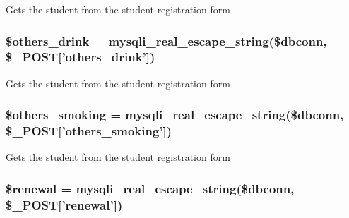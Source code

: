 \-Gets the student from the student registration form \hypertarget{admin__view_2validate_2studentVal_8php_ad8d98a0ffa836c8f5ff6cd94cc18dca1}{
\subsubsection[{\$others\-\_\-drink}]{\setlength{\rightskip}{0pt plus 5cm}\$others\-\_\-drink = mysqli\-\_\-real\-\_\-escape\-\_\-string(\$dbconn, \$\-\_\-\-P\-O\-S\-T\mbox{[}'others\-\_\-drink'\mbox{]})}}\label{admin__view_2validate_2studentVal_8php_ad8d98a0ffa836c8f5ff6cd94cc18dca1}
\-Gets the student from the student registration form \hypertarget{admin__view_2validate_2studentVal_8php_a41f287196869fc73324563f84fc1ea73}{
\subsubsection[{\$others\-\_\-smoking}]{\setlength{\rightskip}{0pt plus 5cm}\$others\-\_\-smoking = mysqli\-\_\-real\-\_\-escape\-\_\-string(\$dbconn, \$\-\_\-\-P\-O\-S\-T\mbox{[}'others\-\_\-smoking'\mbox{]})}}\label{admin__view_2validate_2studentVal_8php_a41f287196869fc73324563f84fc1ea73}
\-Gets the student from the student registration form \hypertarget{admin__view_2validate_2studentVal_8php_a1a67d224b0f0712693c41c17f2c85183}{
\subsubsection[{\$renewal}]{\setlength{\rightskip}{0pt plus 5cm}\$renewal = mysqli\-\_\-real\-\_\-escape\-\_\-string(\$dbconn, \$\-\_\-\-P\-O\-S\-T\mbox{[}'renewal'\mbox{]})}}\label{admin__view_2validate_2studentVal_8php_a1a67d224b0f0712693c41c17f2c85183}
